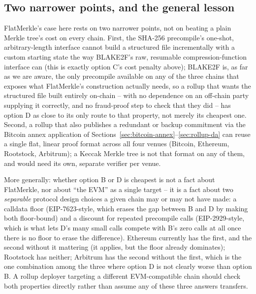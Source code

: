 \subsection{Two narrower points, and the general lesson}
\label{sec:rollup-eth-conclusion}

FlatMerkle's case here rests on two narrower points, not on beating a
plain Merkle tree's cost on every chain. First, the SHA-256 precompile's
one-shot, arbitrary-length interface cannot build a structured file
incrementally with a custom starting state the way BLAKE2F's raw,
resumable compression-function interface can (this is exactly option C's
cost penalty above); BLAKE2F is, as far as we are aware, the only
precompile available on any of the three chains that exposes what
FlatMerkle's construction actually needs, so a rollup that wants the
structured file built entirely on-chain -- with no dependence on an
off-chain party supplying it correctly, and no fraud-proof step to check
that they did -- has option D as close to its only route to that
property, not merely its cheapest one. Second, a rollup that also
publishes a redundant or backup commitment via the Bitcoin annex
application of Sections~\ref{sec:bitcoin-annex}--\ref{sec:rollup-da} can
reuse a single flat, linear proof format across all four venues (Bitcoin,
Ethereum, Rootstock, Arbitrum); a Keccak Merkle tree is not that format on
any of them, and would need its own, separate verifier per venue.

More generally: whether option B or D is cheapest is not a fact about
FlatMerkle, nor about ``the EVM'' as a single target -- it is a fact
about two \emph{separable} protocol design choices a given chain may or
may not have made: a calldata floor (EIP-7623-style, which erases the gap
between B and D by making both floor-bound) and a discount for repeated
precompile calls (EIP-2929-style, which is what lets D's many small calls
compete with B's zero calls at all once there is no floor to erase the
difference). Ethereum currently has the first, and the second without it
mattering (it applies, but the floor already dominates); Rootstock has
neither; Arbitrum has the second without the first, which is the one
combination among the three where option D is not clearly worse than
option B. A rollup deployer targeting a different EVM-compatible chain
should check both properties directly rather than assume any of these
three answers transfers.

